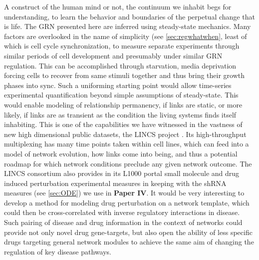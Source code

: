 A construct of the human mind or not, the continuum we inhabit begs for understanding, to learn the behavior and boundaries of the perpetual change that is life. The GRN presented here are inferred using steady-state mechanics. Many factors are overlooked in the name of simplicity (see \cref{sec:regwhatwhen}, least of which is cell cycle synchronization, to measure separate experiments through similar periods of cell development and presumably under similar GRN regulation. This can be accomplished through starvation, \eg media deprivation forcing cells to recover from same stimuli together and thus bring their growth phases into sync. Such a uniforming starting point would allow time-series experimental quantification beyond simple assumptions of steady-state. This would enable modeling of relationship permanency, \ie if links are static, or more likely, if links are as transient as the condition the living systems finds itself inhabiting. This is one of the capabilities we have witnessed in the vastness of new high dimensional public datasets, \eg the LINCS project \citep{subramanian2017next}. Its high-throughput multiplexing has many time points taken within cell lines, which can feed into a model of network evolution, how links come into being, and thus a potential roadmap for which network conditions preclude any given network outcome.
The LINCS consortium also provides in its L1000 portal small molecule and drug induced perturbation experimental measures in keeping with the shRNA measures (see \cref{sec:ODE}) we use in \textbf{Paper IV}. It would be very interesting to develop a method for modeling drug perturbation on a network template, which could then be cross-correlated with inverse regulatory interactions in disease. Such pairing of disease and drug information in the context of networks could provide not only novel drug gene-targets, but also open the ability of less specific drugs targeting general network modules to achieve the same aim of changing the regulation of key disease pathways.

